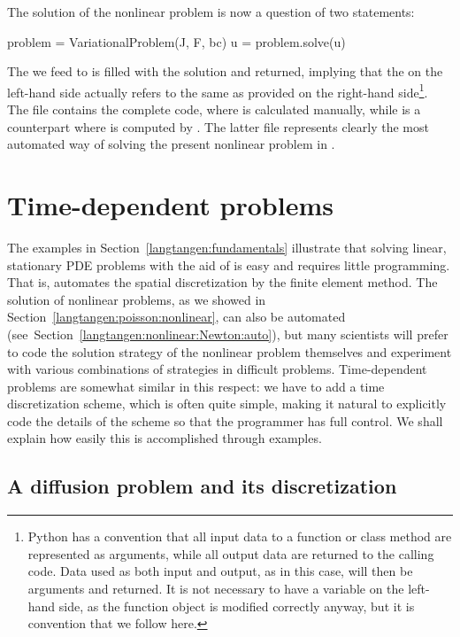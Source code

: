 The solution of the nonlinear problem is now a question of two statements:
\begin{python}
problem = VariationalProblem(J, F, bc)
u = problem.solve(u)
\end{python}
The  we feed to  is filled with the solution
and returned, implying that the  on the left-hand side actually
refers to the same  as provided on the right-hand side\footnote{Python
has a convention that all input data to a function or class method are
represented as arguments, while all output data are returned to the calling
code. Data used as both input and output, as in this case, will then be
arguments and returned. It is not necessary to have a variable on the
left-hand side, as the function object is modified correctly anyway,
but it is convention that we follow here.}.
The file  contains the complete code, where
 is calculated manually, while  is
a counterpart where  is computed by .
The latter file represents clearly the most automated way of solving
the present nonlinear problem in \fenics.

\section{Time-dependent problems}
\label{langtangen:timedep}

The examples in Section~\ref{langtangen:fundamentals} illustrate that
solving linear, stationary PDE problems with the aid of \fenics{} is
easy and requires little programming.  That is, \fenics{} automates
the spatial discretization by the finite element method.  The solution
of nonlinear problems, as we showed in
Section~\ref{langtangen:poisson:nonlinear}, can also be automated
(see~Section~\ref{langtangen:nonlinear:Newton:auto}), but many
scientists will prefer to code the solution strategy of the nonlinear
problem themselves and experiment with various combinations of
strategies in difficult problems. Time-dependent problems are somewhat
similar in this respect: we have to add a time discretization scheme,
which is often quite simple, making it natural to explicitly code the
details of the scheme so that the programmer has full control.  We
shall explain how easily this is accomplished through examples.

\subsection{A diffusion problem and its discretization}
\label{langtangen:timedep:diffusion1}

